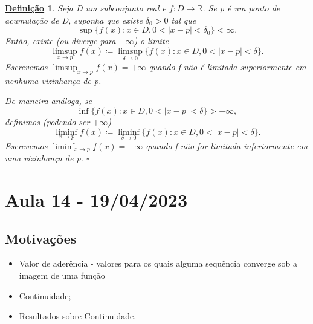 \documentclass{article}
\newtheorem*{def*}{\underline{Defini\c c\~ao}}
\begin{document}
\begin{def*}
  Seja D um subconjunto real e $f:D\rightarrow \mathbb{R}$. Se p \'e um ponto de acumula\c c\~ao de D, suponha que existe $\delta_{0} > 0$
  tal que 
    $$
    \sup{\{f(x):x\in D, 0<|x-p|<\delta_{0}\}} < \infty.
    $$
    Ent\~ao, existe (ou diverge para $-\infty$) o limite 
      $$
      \limsup_{x\to p}f(x)\coloneqq \limsup_{\delta\to0}\{f(x):x\in D, 0<|x-p|<\delta\}.
      $$
      Escrevemos $\limsup_{x\to p}f(x) = +\infty$ quando f n\~ao \'e limitada superiormente em nenhuma vizinhan\c ca de p.

      De maneira an\'aloga, se 
        $$
        \inf{\{f(x):x\in D, 0<|x-p|<\delta\}} > -\infty,
        $$
      definimos (podendo ser $+\infty$) 
        $$
        \liminf_{x\to p}f(x)\coloneqq \liminf_{\delta\to0}\{f(x):x\in D, 0<|x-p|<\delta\}.
        $$
      Escrevemos $\liminf_{x\to p}f(x) = -\infty$ quando f n\~ao for limitada inferiormente em uma vizinhan\c ca de p. $\square$
\end{def*}
\newpage

\section{Aula 14 - 19/04/2023}
\subsection{Motiva\c c\~oes}
\begin{itemize}
  \item Valor de ader\^encia - valores para os quais alguma sequ\^encia converge sob a imagem de uma fun\c c\~ao
  \item Continuidade;
  \item Resultados sobre Continuidade.
\end{itemize}
\end{document}
